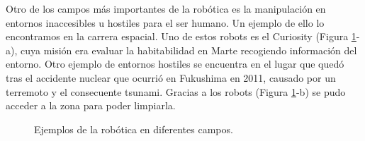 Otro de los campos más importantes de la robótica es la manipulación en entornos inaccesibles u hostiles para el ser humano. Un ejemplo de ello lo encontramos en la carrera espacial. Uno de estos robots es el Curiosity (Figura \ref{fig:robots}-a), cuya misión era evaluar la habitabilidad en Marte recogiendo información del entorno. Otro ejemplo de entornos hostiles se encuentra en el lugar que quedó tras el accidente nuclear que ocurrió en Fukushima en 2011, causado por un terremoto y el consecuente tsunami. Gracias a los robots (Figura \ref{fig:robots}-b) se pudo acceder a la zona para poder limpiarla.\\
\begin{figure}[h!]
  \begin{center}
    \hspace{2mm}
  \end{center}
\caption{Ejemplos de la robótica en diferentes campos.} \label{fig:robots}
\end{figure}

